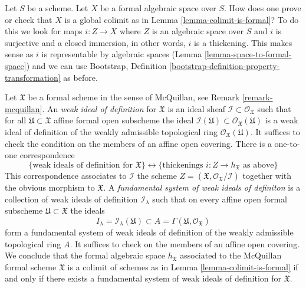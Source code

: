 \noindent
Let $S$ be a scheme. Let $X$ be a formal algebraic space over $S$.
How does one prove or check that $X$ is a global colimit as in
Lemma \ref{lemma-colimit-is-formal}? To do this we look for maps
$i : Z \to X$ where $Z$ is an algebraic space over $S$ and $i$ is
surjective and a closed immersion, in other words, $i$ is a thickening.
This makes sense as $i$ is representable by algebraic spaces
(Lemma \ref{lemma-space-to-formal-space}) and we can use
Bootstrap, Definition \ref{bootstrap-definition-property-transformation}
as before.

\begin{remark}
\label{remark-weak-ideals-of-definition}
Let $\mathfrak X$ be a formal scheme in the sense of McQuillan, see
Remark \ref{remark-mcquillan}. An {\it weak ideal of definition}
for $\mathfrak X$ is an ideal sheaf
$\mathcal{I} \subset \mathcal{O}_\mathfrak X$ such that
for all $\mathfrak U \subset \mathfrak X$ affine formal open subscheme
the ideal
$\mathcal{I}(\mathfrak U) \subset \mathcal{O}_\mathfrak X(\mathfrak U)$
is a weak ideal of definition of the weakly admissible topological ring
$\mathcal{O}_\mathfrak X(\mathfrak U)$.
It suffices to check the condition on the members of an affine open covering.
There is a one-to-one correspondence
$$
\{\text{weak ideals of definition for }\mathfrak X\}
\leftrightarrow
\{\text{thickenings }i : Z \to h_\mathfrak X\text{ as above}\}
$$
This correspondence associates to $\mathcal{I}$ the scheme
$Z = (\mathfrak X, \mathcal{O}_\mathfrak X/\mathcal{I})$
together with the obvious morphism to $\mathfrak X$.
A {\it fundamental system of weak ideals of definiton}
is a collection of weak ideals of definition
$\mathcal{I}_\lambda$ such that on every affine open
formal subscheme $\mathfrak U \subset \mathfrak X$ the
ideals
$$
I_\lambda = \mathcal{I}_\lambda(\mathfrak U) \subset
A = \Gamma(\mathfrak U, \mathcal{O}_\mathfrak X)
$$
form a fundamental system of weak ideals of definition of the
weakly admissible topological ring $A$. It suffices to check
on the members of an affine open covering. We conclude that
the formal algebraic space $h_\mathfrak X$ associated to
the McQuillan formal scheme $\mathfrak X$ is a colimit of schemes as
in Lemma \ref{lemma-colimit-is-formal} if and only if
there exists a fundamental system of weak ideals of definition
for $\mathfrak X$.
\end{remark}

